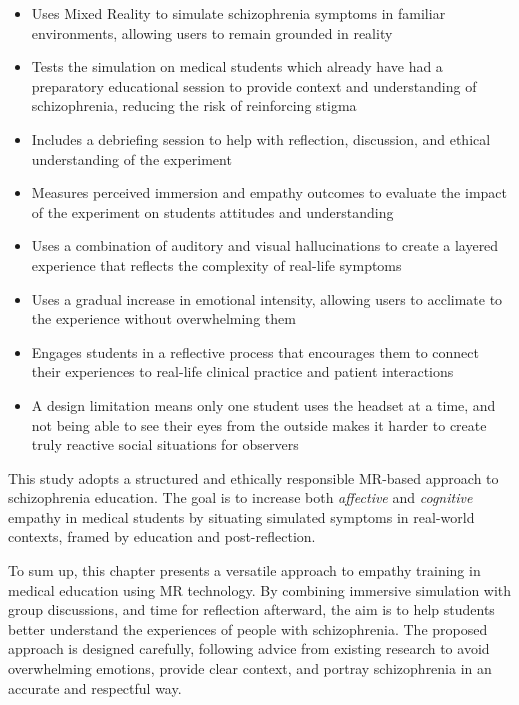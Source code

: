 \begin{itemize}
    \item Uses Mixed Reality to simulate schizophrenia symptoms in familiar environments, allowing users to remain grounded in reality
    \item Tests the simulation on medical students which already have had a preparatory educational session to provide context and understanding of schizophrenia, reducing the risk of reinforcing stigma
    \item Includes a debriefing session to help with reflection, discussion, and ethical understanding of the experiment
    \item Measures perceived immersion and empathy outcomes to evaluate the impact of the experiment on students attitudes and understanding
    \item Uses a combination of auditory and visual hallucinations to create a layered experience that reflects the complexity of real-life symptoms
    \item Uses a gradual increase in emotional intensity, allowing users to acclimate to the experience without overwhelming them
    \item Engages students in a reflective process that encourages them to connect their experiences to real-life clinical practice and patient interactions
    \item A design limitation means only one student uses the headset at a time, and not being able to see their eyes from the outside makes it harder to create truly reactive social situations for observers
\end{itemize}

This study adopts a structured and ethically responsible MR-based approach to schizophrenia education. The goal is to increase both \textit{affective} and \textit{cognitive} empathy in medical students by situating simulated symptoms in real-world contexts, framed by education and post-reflection. 

\vspace{1em}

To sum up, this chapter presents a versatile approach to empathy training in medical education using MR technology. By combining immersive simulation with group discussions, and time for reflection afterward, the aim is to help students better understand the experiences of people with schizophrenia. The proposed approach is designed carefully, following advice from existing research to avoid overwhelming emotions, provide clear context, and portray schizophrenia in an accurate and respectful way.
